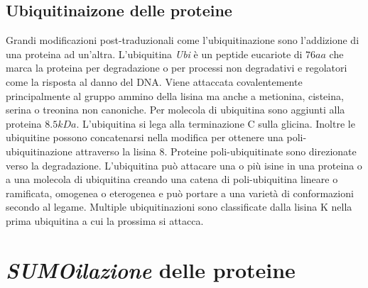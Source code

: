 \subsection{Ubiquitinaizone delle proteine}
Grandi modificazioni post-traduzionali come l'ubiquitinazione sono l'addizione di una proteina ad un'altra. L'ubiquitina \emph{Ubi} \`e un peptide eucariote di $76aa$ che marca la proteina per degradazione o per processi non
degradativi e regolatori come la risposta al danno del DNA. Viene attaccata covalentemente principalmente al gruppo ammino della lisina ma anche a metionina, cisteina, serina o treonina non canoniche. Per molecola di 
ubiquitina sono aggiunti alla proteina $8.5kDa$. L'ubiquitina si lega alla terminazione C sulla glicina. Inoltre le ubiquitine possono concatenarsi nella modifica per ottenere una poli-ubiquitinazione attraverso la lisina
$8$. Proteine poli-ubiquitinate sono direzionate verso la degradazione. L'ubiquitina pu\`o attacare una o pi\`u isine in una proteina o a una molecola di ubiquitina creando una catena di poli-ubiquitina lineare o 
ramificata, omogenea o eterogenea e pu\`o portare a una variet\`a di conformazioni secondo al legame. Multiple ubiquitinazioni sono classificate dalla lisina K nella prima ubiquitina a cui la prossima si attacca. 
\section{\emph{SUMOilazione} delle proteine}
